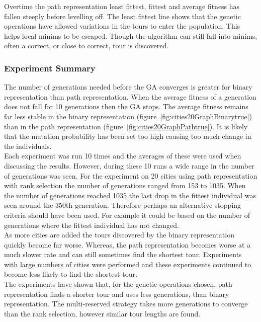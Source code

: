 \documentclass[10pt,a4paper,openbib]{article}
\begin{document}
\begin{multicols}{2}
\noindent Overtime the path representation least fittest, fittest and average fitness has fallen steeply before levelling off. The least fittest line shows that the genetic operations have allowed variations in the tours to enter the population. This helps local minims to be escaped. Though the algorithm can still fall into minims, often a correct, or close to correct, tour is discovered.\\


\subsubsection{Experiment Summary}

The number of generations needed before the GA converges is greater for binary representation than path representation. When the average fitness of a generation does not fall for 10 generations then the GA stops. The average fitness remains far less stable in the binary representation (figure~\ref{fig:cities20GraphBinarytrue}) than in the path representation (figure~\ref{fig:cities20GraphPathtrue}). It is likely that the mutation probability has been set too high causing too much change in the individuals. \\

\noindent Each experiment was run 10 times and the averages of these were used when discussing the results. However, during these 10 runs a wide range in the number of generations was seen. For the experiment on 20 cities using path representation with rank selection the number of generations ranged from 153 to 1035. When the number of generations reached 1035 the last drop in the fittest individual was seen around the 350th generation. Therefore perhaps an alternative stopping criteria should have been used. For example it could be based on the number of generations where the fittest individual has not changed.\\

\noindent As more cities are added the tours discovered by the binary representation quickly become far worse. Whereas, the path representation becomes worse at a much slower rate and can still sometimes find the shortest tour. Experiments with large numbers of cities were performed and these experiments continued to become less likely to find the shortest tour.  \\

\noindent The experiments have shown that, for the genetic operations chosen, path representation finds a shorter tour and uses less generations, than binary representation. The multi-reserved strategy takes more generations to converge than the rank selection, however similar tour lengths are found.


\end{multicols}
\end{document}
